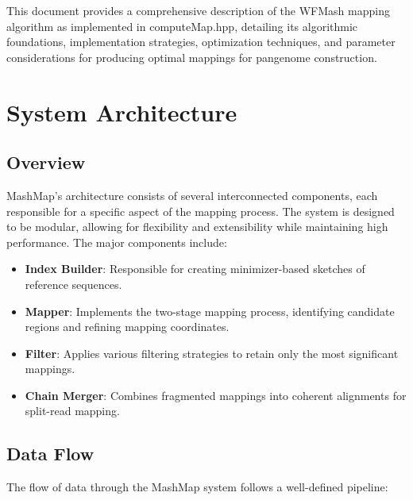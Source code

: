 \documentclass{article}
\begin{document}
This document provides a comprehensive description of the WFMash mapping algorithm as implemented in computeMap.hpp, detailing its algorithmic foundations, implementation strategies, optimization techniques, and parameter considerations for producing optimal mappings for pangenome construction.

\section{System Architecture}

\subsection{Overview}

MashMap's architecture consists of several interconnected components, each responsible for a specific aspect of the mapping process. The system is designed to be modular, allowing for flexibility and extensibility while maintaining high performance. The major components include:

\begin{itemize}
    \item \textbf{Index Builder}: Responsible for creating minimizer-based sketches of reference sequences.
    
    \item \textbf{Mapper}: Implements the two-stage mapping process, identifying candidate regions and refining mapping coordinates.
    
    \item \textbf{Filter}: Applies various filtering strategies to retain only the most significant mappings.
    
    \item \textbf{Chain Merger}: Combines fragmented mappings into coherent alignments for split-read mapping.
\end{itemize}

\subsection{Data Flow}

The flow of data through the MashMap system follows a well-defined pipeline:
\end{document}
